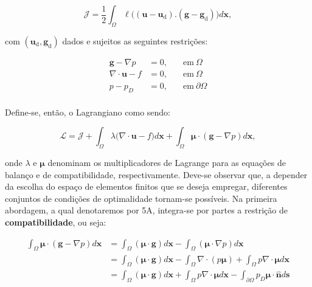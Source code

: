 \begin{equation}
	\boldsymbol{\mathcal{J}} = \dfrac{1}{2} \int_{\Omega} \ell \big( (\mathbf{u} - \mathbf{u}_{\text{d}}). (\mathbf{g} - \mathbf{g}_{\text{d}})\big)d\mathbf{x},
\end{equation}

com $ (\mathbf{u}_{\text{d}},\textbf{g}_{\text{d}}) $ dados e sujeitos as seguintes restrições:

\begin{equation}
	\begin{aligned}
		\textbf{g} -  \nabla p &= 0, \quad &\text{em} \ \Omega \\
		\nabla \cdot \textbf{u} - f &= 0, \quad &\text{em} \ \Omega \\
		p - p_{D} &= 0, \quad  &\text{em} \ \partial \Omega \\
	\end{aligned}
\end{equation}

Define-se, então, o Lagrangiano como sendo:

\begin{equation}\label{eq5.10}
	\boldsymbol{\mathcal{L}} = \boldsymbol{\mathcal{J}} + \int_{\Omega} \lambda \big(\nabla \cdot \textbf{u} - f\big)d\mathbf{x} + \int_{\Omega} \boldsymbol{\mu} \cdot (\textbf{g} -  \nabla p)d\mathbf{x},
\end{equation}

onde $\lambda$ e $\boldsymbol{\mu}$ denominam os multiplicadores de Lagrange para as equações de balanço e de compatibilidade, respectivamente. Deve-se observar que, a depender da escolha do espaço de elementos finitos que se deseja empregar, diferentes conjuntos de condições de optimalidade tornam-se possíveis. Na primeira abordagem, a qual denotaremos por 5A, integra-se por partes a restrição de \textbf{compatibilidade}, ou seja:

\begin{equation}
	\begin{aligned}
		\int_{\Omega} \boldsymbol{\mu} \cdot (\mathbf{g} -  \nabla p)d\mathbf{x} &= \int_{\Omega}(\boldsymbol{\mu} \cdot \mathbf{g})d\mathbf{x} - \int_{\Omega}(\boldsymbol{\mu} \cdot  \nabla p)d\mathbf{x} \\
		& = \int_{\Omega}(\boldsymbol{\mu} \cdot \mathbf{g})d\mathbf{x} - \int_{\Omega}\nabla \cdot (p\boldsymbol{\mu}) + \int_{\Omega}p\nabla \cdot \boldsymbol{\mu}d\mathbf{x} \\
		& = \int_{\Omega}(\boldsymbol{\mu} \cdot \textbf{g} )d\mathbf{x} + \int_{\Omega}p\nabla \cdot \boldsymbol{\mu}d\mathbf{x} - \int_{\partial \Omega} p_{D} \boldsymbol{\mu} \cdot  \mathbf{\hat{n}}d\mathbf{s} 
	\end{aligned}
\end{equation}

